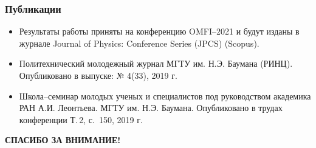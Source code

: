 \documentclass[compress,professionalfont]{beamer}
\begin{document}
\begin{frame}
\frametitle{Публикации}

\begin{itemize}
\item Результаты работы приняты на конференцию OMFI--2021 и будут изданы в журнале Journal of Physics: Conference Series (JPCS) (Scopus).
\item Политехнический молодежный журнал МГТУ им. Н.Э. Баумана (РИНЦ). Опубликовано в выпуске: № 4(33), 2019 г.
\item Школа--семинар молодых ученых и специалистов под руководством академика РАН А.И. Леонтьева. МГТУ им. Н.Э. Баумана. Опубликовано в трудах конференции Т.\,2, с.~150, 2019 г.
\end{itemize}
\end{frame}

\begin{frame}

\begin{center}
\Large\bf СПАСИБО ЗА ВНИМАНИЕ!
\end{center}

\end{frame}
\end{document}
